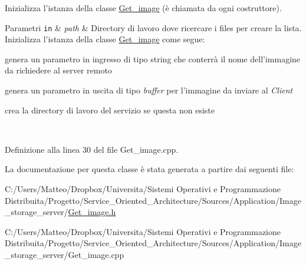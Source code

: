 Inizializza l'istanza della classe \hyperlink{class_get__image}{Get\-\_\-image} (è chiamata da ogni costruttore). 


\begin{DoxyParams}[1]{Parametri}
\mbox{\tt in}  & {\em path} & Directory di lavoro dove ricercare i files per creare la lista. Inizializza l'istanza della classe \hyperlink{class_get__image}{Get\-\_\-image} come segue\-: \begin{DoxyItemize}
\item genera un parametro in ingresso di tipo {\ttfamily string} che conterrà il nome dell'immagine da richiedere al server remoto \item genera un parametro in uscita di tipo {\itshape buffer} per l'immagine da inviare al {\itshape Client} \item crea la directory di lavoro del servizio se questa non esiste \end{DoxyItemize}
\\
\hline
\end{DoxyParams}


Definizione alla linea 30 del file Get\-\_\-image.\-cpp.



La documentazione per questa classe è stata generata a partire dai seguenti file\-:\begin{DoxyCompactItemize}
\item 
C\-:/\-Users/\-Matteo/\-Dropbox/\-Universita/\-Sistemi Operativi e Programmazione Distribuita/\-Progetto/\-Service\-\_\-\-Oriented\-\_\-\-Architecture/\-Sources/\-Application/\-Image\-\_\-storage\-\_\-server/\hyperlink{_get__image_8h}{Get\-\_\-image.\-h}\item 
C\-:/\-Users/\-Matteo/\-Dropbox/\-Universita/\-Sistemi Operativi e Programmazione Distribuita/\-Progetto/\-Service\-\_\-\-Oriented\-\_\-\-Architecture/\-Sources/\-Application/\-Image\-\_\-storage\-\_\-server/Get\-\_\-image.\-cpp\end{DoxyCompactItemize}
